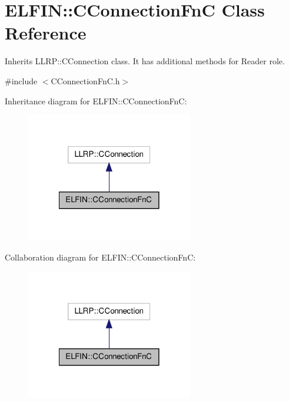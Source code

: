 \hypertarget{class_e_l_f_i_n_1_1_c_connection_fn_c}{\section{E\-L\-F\-I\-N\-:\-:C\-Connection\-Fn\-C Class Reference}
\label{class_e_l_f_i_n_1_1_c_connection_fn_c}
}


Inherits L\-L\-R\-P\-::\-C\-Connection class. It has additional methods for Reader role.  




{\ttfamily \#include $<$C\-Connection\-Fn\-C.\-h$>$}



Inheritance diagram for E\-L\-F\-I\-N\-:\-:C\-Connection\-Fn\-C\-:
\nopagebreak
\begin{figure}[H]
\begin{center}
\leavevmode
\includegraphics[width=206pt]{class_e_l_f_i_n_1_1_c_connection_fn_c__inherit__graph}
\end{center}
\end{figure}


Collaboration diagram for E\-L\-F\-I\-N\-:\-:C\-Connection\-Fn\-C\-:
\nopagebreak
\begin{figure}[H]
\begin{center}
\leavevmode
\includegraphics[width=206pt]{class_e_l_f_i_n_1_1_c_connection_fn_c__coll__graph}
\end{center}
\end{figure}
